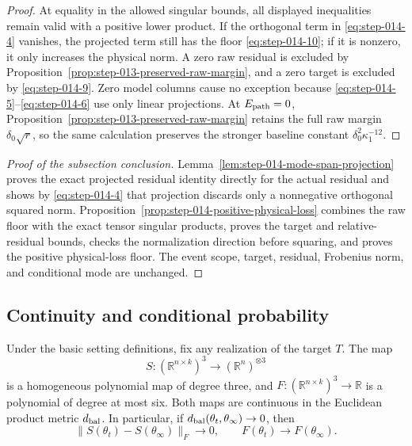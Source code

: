 \begin{proof}
At equality in the allowed singular bounds, all displayed inequalities remain
valid with a positive lower product. If the orthogonal term in \eqref{eq:step-014-4} vanishes,
the projected term still has the floor \eqref{eq:step-014-10}; if it is nonzero, it only
increases the physical norm. A zero raw residual is excluded by
Proposition~\ref{prop:step-013-preserved-raw-margin}, and a
zero target is excluded by \eqref{eq:step-014-9}. Zero model columns cause no exception because
\eqref{eq:step-014-5}--\eqref{eq:step-014-6} use only linear projections. At \(E_{\rm path}=0\), Proposition~\ref{prop:step-013-preserved-raw-margin} retains the full raw margin \(\delta_0\sqrt r\), so the same
calculation preserves the stronger baseline constant
\(\delta_0^2\kappa_1^{-12}\). 

\end{proof}

\begin{proof}[Proof of the subsection conclusion]

Lemma~\ref{lem:step-014-mode-span-projection} proves the exact projected
residual identity directly for the
actual residual and shows by \eqref{eq:step-014-4} that projection discards only a nonnegative
orthogonal squared norm. Proposition~\ref{prop:step-014-positive-physical-loss}
combines the raw floor with the exact tensor singular products,
proves the target and relative-residual bounds, checks the normalization
direction before squaring, and proves the positive physical-loss floor. The
event scope, target, residual, Frobenius norm,
and conditional mode are unchanged.

\end{proof}

\subsection{Continuity and conditional probability}\label{app:step-015}

\begin{proposition}
\label{prop:step-015-polynomial-continuity}
Under the basic setting definitions, fix any realization of the target
\(T\). The map
\[
  S:(\mathbb R^{n\times k})^3\longrightarrow
    (\mathbb R^n)^{\otimes3}
\]
is a homogeneous polynomial map of degree three, and
\(F:(\mathbb R^{n\times k})^3\to\mathbb R\) is a polynomial of degree at
most six. Both maps are continuous in the Euclidean product metric
\(d_{\rm bal}\). In particular, if
\(d_{\rm bal}(\theta_t,\theta_\infty)\to0\), then
\begin{equation}
  \|S(\theta_t)-S(\theta_\infty)\|_F\to0,
  \qquad
  F(\theta_t)\to F(\theta_\infty).                       \label{eq:step-015-1}
\end{equation}

\end{proposition}

